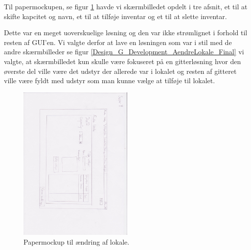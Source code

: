 Til papermockupen, se figur \ref{Design_G_Development_AendreLokale} havde vi skærmbilledet opdelt i tre afsnit, et til at skifte kapcitet og navn, et til at tilføje inventar og et til at slette inventar.

Dette var en meget uoverskuelige løsning og den var ikke strømlignet i forhold til resten af GUI'en. Vi valgte derfor at lave en løsningen som var i stil med de andre skærmbilleder se figur \ref{Design_G_Development_AendreLokale_Final} vi valgte, at skærmbilledet kun skulle være fokuseret på en gitterløsning hvor den øverste del ville være det udstyr der allerede var i lokalet og resten af gitteret ville være fyldt med udstyr som man kunne vælge at tilføje til lokalet.

\begin{figure}[h!]
  \centering
    \includegraphics[width=0.5\textwidth]{Appendix/GUI-Prototype/PaperMockup/AendreLokale_001}
  \caption{Papermockup til ændring af lokale.}
\label{Design_G_Development_AendreLokale}
\end{figure} 